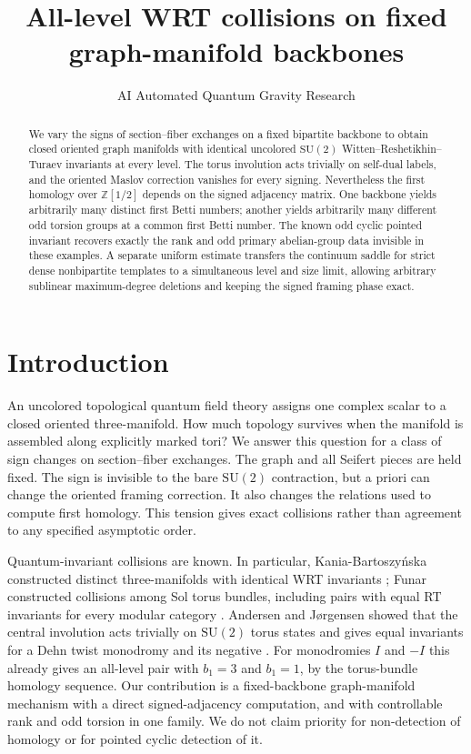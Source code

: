 \documentclass[11pt]{article}
\title{All-level WRT collisions on fixed\\ graph-manifold backbones}
\author{AI Automated Quantum Gravity Research}
\date{}
\theoremstyle{remark}
\newcommand{\SU}{\mathrm{SU}}
\begin{document}
\maketitle
\begin{abstract}
We vary the signs of section--fiber exchanges on a fixed bipartite backbone to obtain closed oriented graph manifolds with identical uncolored \(\SU(2)\) Witten--Reshetikhin--Turaev invariants at every level. The torus involution acts trivially on self-dual labels, and the oriented Maslov correction vanishes for every signing. Nevertheless the first homology over \(\mathbb Z[1/2]\) depends on the signed adjacency matrix. One backbone yields arbitrarily many distinct first Betti numbers; another yields arbitrarily many different odd torsion groups at a common first Betti number. The known odd cyclic pointed invariant recovers exactly the rank and odd primary abelian-group data invisible in these examples. A separate uniform estimate transfers the continuum saddle for strict dense nonbipartite templates to a simultaneous level and size limit, allowing arbitrary sublinear maximum-degree deletions and keeping the signed framing phase exact.
\end{abstract}

\section{Introduction}
An uncolored topological quantum field theory assigns one complex scalar to a closed oriented three-manifold. How much topology survives when the manifold is assembled along explicitly marked tori? We answer this question for a class of sign changes on section--fiber exchanges. The graph and all Seifert pieces are held fixed. The sign is invisible to the bare \(\SU(2)\) contraction, but a priori can change the oriented framing correction. It also changes the relations used to compute first homology. This tension gives exact collisions rather than agreement to any specified asymptotic order.

Quantum-invariant collisions are known. In particular, Kania-Bartoszy\'nska constructed distinct three-manifolds with identical WRT invariants \cite{Kania}; Funar constructed collisions among Sol torus bundles, including pairs with equal RT invariants for every modular category \cite[Theorems~1.1 and~1.3]{Funar}. Andersen and J{\o}rgensen showed that the central involution acts trivially on \(\SU(2)\) torus states and gives equal invariants for a Dehn twist monodromy and its negative \cite[Eq.~(5)]{AJ}. For monodromies \(I\) and \(-I\) this already gives an all-level pair with \(b_1=3\) and \(b_1=1\), by the torus-bundle homology sequence. Our contribution is a fixed-backbone graph-manifold mechanism with a direct signed-adjacency computation, and with controllable rank and odd torsion in one family. We do not claim priority for non-detection of homology or for pointed cyclic detection of it.
\end{document}
